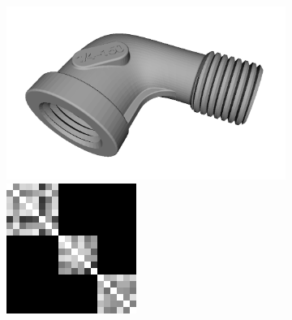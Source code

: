 \begin{figure}[ht]
\begin{subfigure}[b]{0.23\linewidth}
	\end{subfigure}
	\begin{subfigure}[b]{0.23\linewidth}
		\includegraphics[width=\linewidth]{fig/reg/pipe.png} \\
		\includegraphics[width=\linewidth]{fig/reg/reg3Dtrain_pipe.png} 
	\end{subfigure}
	\begin{subfigure}[b]{0.23\linewidth}

\end{subfigure}
\end{figure}

